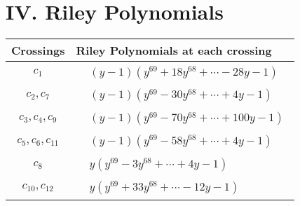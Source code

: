 \documentclass[1p]{elsarticle_modified}
\theoremstyle{definition}
\begin{document}
\centering \section*{ IV. Riley Polynomials}
\begin{tabular}{m{50pt}|m{274pt}}
Crossings & \hspace{64pt}Riley Polynomials at each crossing \\
\hline $$\begin{aligned}c_{1}\end{aligned}$$&$\begin{aligned}
&(y-1)(y^{69}+18 y^{68}+\cdots-28 y-1)
\end{aligned}$\\
\hline $$\begin{aligned}c_{2},c_{7}\end{aligned}$$&$\begin{aligned}
&(y-1)(y^{69}-30 y^{68}+\cdots+4 y-1)
\end{aligned}$\\
\hline $$\begin{aligned}c_{3},c_{4},c_{9}\end{aligned}$$&$\begin{aligned}
&(y-1)(y^{69}-70 y^{68}+\cdots+100 y-1)
\end{aligned}$\\
\hline $$\begin{aligned}c_{5},c_{6},c_{11}\end{aligned}$$&$\begin{aligned}
&(y-1)(y^{69}-58 y^{68}+\cdots+4 y-1)
\end{aligned}$\\
\hline $$\begin{aligned}c_{8}\end{aligned}$$&$\begin{aligned}
&y(y^{69}-3 y^{68}+\cdots+4 y-1)
\end{aligned}$\\
\hline $$\begin{aligned}c_{10},c_{12}\end{aligned}$$&$\begin{aligned}
&y(y^{69}+33 y^{68}+\cdots-12 y-1)
\end{aligned}$\\
\hline
\end{tabular}
\vskip 2pc
\end{document}
